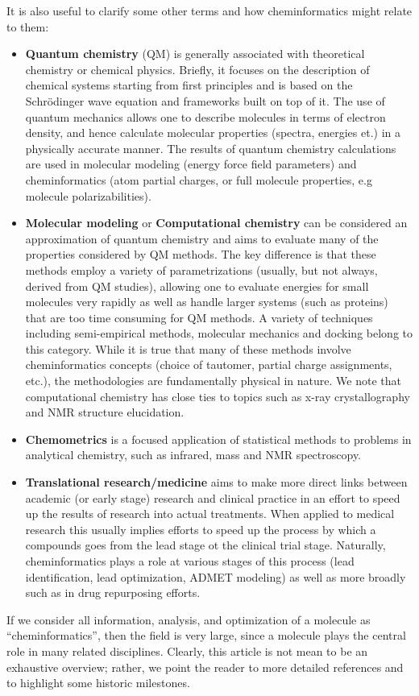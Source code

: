 \documentclass{sig-alternate}
\begin{document}
It is also useful to clarify some other terms and how
cheminformatics might relate to them:
\begin{itemize}
\item \textbf{Quantum chemistry} (QM) is generally associated with
  theoretical chemistry or chemical physics. Briefly, it focuses on
  the description of chemical systems starting from first principles
  and is based on the Schr\"{o}dinger wave equation and frameworks
  built on top of it. The use of quantum mechanics allows one to
  describe molecules in terms of electron density, and hence calculate
  molecular properties (spectra, energies et.) in a physically
  accurate manner.  The results of quantum chemistry calculations are
  used in molecular modeling (energy force field parameters) and
  cheminformatics (atom partial charges, or full molecule properties,
  e.g molecule polarizabilities).
\item \textbf{Molecular modeling} or \textbf{Computational chemistry}
  can be considered an approximation of quantum chemistry and aims to
  evaluate many of the properties considered by QM methods. The key
  difference is that these methods employ a variety of
  parametrizations (usually, but not always, derived from QM studies),
  allowing one to evaluate energies for small molecules very rapidly
  as well as handle larger systems (such as proteins) that are too
  time consuming for QM methods. A variety of techniques including
  semi-empirical methods, molecular mechanics and docking belong to
  this category. While it is true that many of these methods involve
  cheminformatics concepts (choice of tautomer, partial charge
  assignments, etc.), the methodologies are fundamentally physical in
  nature. We note that computational chemistry has close ties to
  topics such as x-ray crystallography and NMR structure elucidation.
\item \textbf{Chemometrics} is a focused application of statistical
  methods to problems in analytical chemistry, such as infrared, mass
  and NMR spectroscopy.
\item \textbf{Translational research/medicine} aims to make more
  direct links between academic (or early stage) research and clinical
  practice in an effort to speed up the results of research into
  actual treatments. When applied to medical research this usually
  implies efforts to speed up the process by which a compounds goes
  from the lead stage ot the clinical trial stage. Naturally,
  cheminformatics plays a role at various stages of this process (lead
  identification, lead optimization, ADMET modeling) as well as more
  broadly such as in drug repurposing efforts.
\end{itemize}
If we consider all information, analysis, and optimization of a
molecule as ``cheminformatics'', then the field is very large, since a
molecule plays the central role in many related disciplines. Clearly,
this article is not mean to be an exhaustive overview; rather, we
point the reader to more detailed references and to highlight some
historic milestones.
\end{document}
